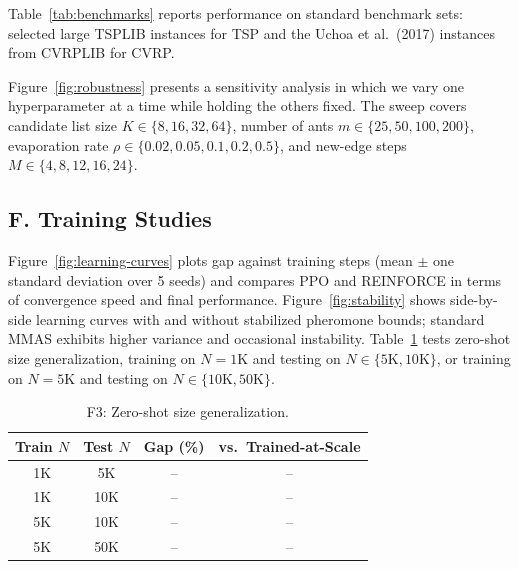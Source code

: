 \documentclass[sigconf,anonymous,review]{acmart}
\theoremstyle{definition}
\theoremstyle{plain}
\begin{document}
Table~\ref{tab:benchmarks} reports performance on standard benchmark sets: selected large TSPLIB instances for TSP and the Uchoa et al.\ (2017) instances from CVRPLIB for CVRP.

\begin{table}[h]
\centering
\caption{E2: Performance on standard benchmarks.}
\label{tab:benchmarks}
\end{table}

Figure~\ref{fig:robustness} presents a sensitivity analysis in which we vary one hyperparameter at a time while holding the others fixed.
The sweep covers candidate list size $K \in \{8,16,32,64\}$, number of ants $m \in \{25,50,100,200\}$, evaporation rate $\rho \in \{0.02,0.05,0.1,0.2,0.5\}$, and new-edge steps $M \in \{4,8,12,16,24\}$.

\subsection{F. Training Studies}

Figure~\ref{fig:learning-curves} plots gap against training steps (mean $\pm$ one standard deviation over 5 seeds) and compares PPO and REINFORCE in terms of convergence speed and final performance.
Figure~\ref{fig:stability} shows side-by-side learning curves with and without stabilized pheromone bounds; standard MMAS exhibits higher variance and occasional instability.
Table~\ref{tab:size-gen} tests zero-shot size generalization, training on $N{=}1$K and testing on $N \in \{5$K$, 10$K$\}$, or training on $N{=}5$K and testing on $N \in \{10$K$, 50$K$\}$.

\begin{table}[h]
\centering
\caption{F3: Zero-shot size generalization.}
\label{tab:size-gen}
\small
\begin{tabular}{cccc}
\toprule
Train $N$ & Test $N$ & Gap (\%) & vs.\ Trained-at-Scale \\
\midrule
1K & 5K & -- & -- \\
1K & 10K & -- & -- \\
5K & 10K & -- & -- \\
5K & 50K & -- & -- \\
\bottomrule
\end{tabular}
\end{table}
\end{document}
